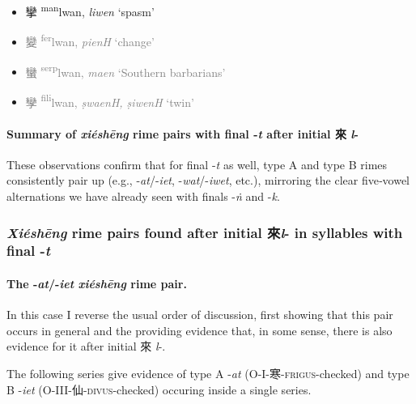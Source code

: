 \begin{itemize}
  \item {\Large{攣}} %
    {\large{{\textsuperscript{man}}lwan}},
    \textit{liwen} `spasm' %

  \item \textcolor{gray}{{\Large{變}} %
    {\large{{\textsuperscript{fer}}lwan}},
    \textit{pienH} `change'} %

  \item \textcolor{gray}{{\Large{蠻}} %
    {\large{{\textsuperscript{serp}}lwan}},
    \textit{maen} `Southern barbarians'} %

  \item \textcolor{gray}{{\Large{孿}} %
    {\large{{\textsuperscript{fili}}lwan}},
    \textit{ṣwaenH, ṣiwenH} `twin'} %

\end{itemize}


\paragraph{Summary of  \textit{xiéshēng} rime pairs with final -\textit{t} after initial 來 \textit{l}-} \label{par:summary-t}
These observations confirm that for final -\textit{t} as well, type A and type B rimes consistently pair up (e.g., -\textit{at}/-\textit{iet}, -\textit{wat}/-\textit{iwet}, etc.), mirroring the clear five‐vowel alternations we have already seen with finals -\textit{ṅ} and -\textit{k}.



\subsubsection{\textit{Xiéshēng} rime pairs found after initial 來\textit{l}- in syllables with final -\textit{t}}
\label{sec:xiesheng-l-t}

\paragraph{The -\textit{at}/-\textit{iet} \textit{xiéshēng} rime pair.}
\label{par:at-iet-XS-pair}
In this case I reverse the usual order of discussion, first showing that this pair occurs in general and the providing evidence that, in some sense, there is also evidence for it after initial 來 \textit{l}-. 

The following series give evidence of type A -\textit{at} (O-I-寒-\textsc{frigus}-checked) and type B -\textit{iet} (O-III-仙-\textsc{divus}-checked) occuring inside a single series.


